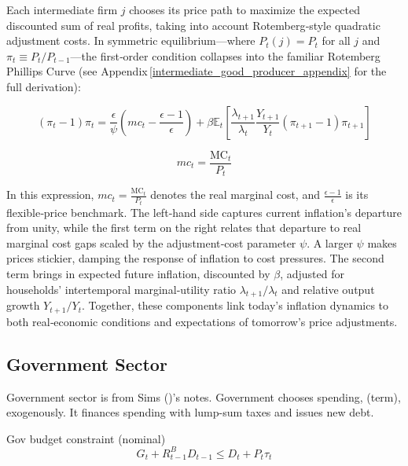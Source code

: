 \documentclass[11pt,preprint]{elsarticle}
\numberwithin{equation}{section}
\numberwithin{figure}{section}
\numberwithin{table}{section}
\begin{document}
Each intermediate firm \(j\) chooses its price path to maximize the
expected discounted sum of real profits, taking into account
Rotemberg‐style quadratic adjustment costs. In symmetric
equilibrium---where \(P_t(j)=P_t\) for all \(j\) and
\(\pi_t \equiv P_t/P_{t-1}\)---the first‐order condition collapses into
the familiar Rotemberg Phillips Curve (see
Appendix\,\ref{intermediate_good_producer_appendix} for the full
derivation):

\begin{equation}
(\pi_t - 1)\pi_t = \frac{\epsilon}{\psi} \left( mc_t - \frac{\epsilon-1}{\epsilon} \right) + \beta \mathbb{E}_t \left[ \frac{\lambda_{t+1}}{\lambda_t} \frac{Y_{t+1}}{Y_t} (\pi_{t+1} - 1)\pi_{t+1} \right]
\label{nkpc}
\end{equation}

\begin{equation}
mc_t = \frac{\text{MC}_t}{P_t}
\label{real_mc}
\end{equation}

In this expression, \(mc_t = \tfrac{\mathrm{MC}_t}{P_t}\) denotes the
real marginal cost, and \(\tfrac{\epsilon-1}{\epsilon}\) is its
flexible‐price benchmark. The left‐hand side captures current
inflation's departure from unity, while the first term on the right
relates that departure to real marginal cost gaps scaled by the
adjustment‐cost parameter \(\psi\). A larger \(\psi\) makes prices
stickier, damping the response of inflation to cost pressures. The
second term brings in expected future inflation, discounted by
\(\beta\), adjusted for households' intertemporal marginal‐utility ratio
\(\lambda_{t+1}/\lambda_t\) and relative output growth \(Y_{t+1}/Y_t\).
Together, these components link today's inflation dynamics to both
real‐economic conditions and expectations of tomorrow's price
adjustments.

\subsection{Government Sector}\label{government-sector}

Government sector is from Sims ()'s
notes. Government chooses spending, (term), exogenously. It finances
spending with lump-sum taxes and issues new debt.

Gov budget constraint (nominal) \begin{equation}
G_t + R^B_{t-1} D_{t-1} \leq D_t + P_t \tau_t \label{Gov_Budget}
\end{equation}
\end{document}
